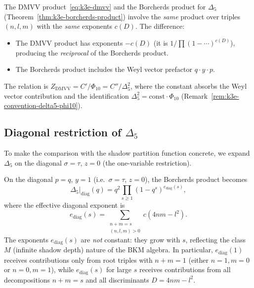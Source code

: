 \begin{remark}
\label{rem:k3e-dmvv-borcherds}
The DMVV product~\eqref{eq:k3e-dmvv} and the Borcherds product for $\Delta_5$ (Theorem~\ref{thm:k3e-borcherds-product}) involve the \emph{same} product over triples $(n,l,m)$ with the \emph{same} exponents $c(D)$. The difference:
\begin{itemize}
\item The DMVV product has exponents $-c(D)$ (it is $1/\prod(1-\cdots)^{c(D)}$), producing the \emph{reciprocal} of the Borcherds product.
\item The Borcherds product includes the Weyl vector prefactor $q \cdot y \cdot p$.
\end{itemize}
The relation is $Z_{\mathrm{DMVV}} = C' / \Phi_{10} = C'' / \Delta_5^2$, where the constant absorbs the Weyl vector contribution and the identification $\Delta_5^2 = \mathrm{const} \cdot \Phi_{10}$ (Remark~\ref{rem:k3e-convention-delta5-phi10}).
\end{remark}

\subsection{Diagonal restriction of $\Delta_5$}
\label{subsec:k3e-diagonal-delta5}

To make the comparison with the shadow partition function concrete, we expand $\Delta_5$ on the diagonal $\sigma = \tau$, $z = 0$ (the one-variable restriction).

\begin{proposition}
\label{prop:k3e-diagonal-delta5}
On the diagonal $p = q$, $y = 1$ (i.e.\ $\sigma = \tau$, $z = 0$), the Borcherds product becomes
\[
 \Delta_5\big|_{\mathrm{diag}}(q) = q^2 \prod_{s \geq 1} (1 - q^s)^{e_{\mathrm{diag}}(s)},
\]
where the effective diagonal exponent is
\[
 e_{\mathrm{diag}}(s)
 = \sum_{\substack{n + m = s \\ (n,l,m) > 0}} c(4nm - l^2).
\]
The exponents $e_{\mathrm{diag}}(s)$ are \emph{not} constant: they grow with $s$, reflecting the class~$M$ (infinite shadow depth) nature of the BKM algebra. In particular, $e_{\mathrm{diag}}(1)$ receives contributions only from root triples with $n + m = 1$ (either $n=1, m=0$ or $n=0, m=1$), while $e_{\mathrm{diag}}(s)$ for large $s$ receives contributions from all decompositions $n + m = s$ and all discriminants $D = 4nm - l^2$.
\ClaimStatusProvedHere
\end{proposition}

